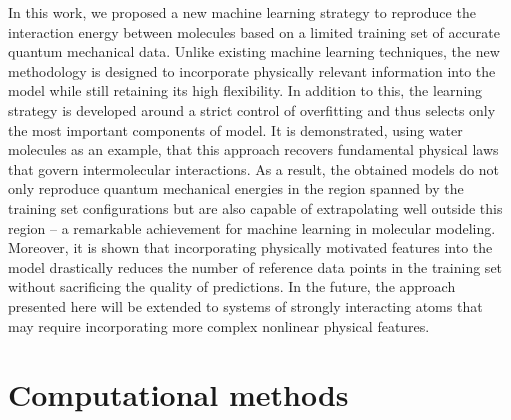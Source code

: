\documentclass[aps,prl,reprint,amsmath,amssymb,nature]{revtex4-1}
\begin{document}
In this work, we proposed a new machine learning strategy to reproduce the interaction energy between molecules based on a limited training set of accurate quantum mechanical data. Unlike existing machine learning techniques, the new methodology is designed to incorporate physically relevant information into the model while still retaining its high flexibility. In addition to this, the learning strategy is developed around a strict control of overfitting and thus selects only the most important components of model. 
It is demonstrated, using water molecules as an example, that this approach recovers fundamental physical laws that govern intermolecular interactions. As a result, the obtained models do not only reproduce quantum mechanical energies in the region spanned by the training set configurations but are also capable of extrapolating well outside this region -- a remarkable achievement for machine learning in molecular modeling. Moreover, it is shown that incorporating physically motivated features into the model drastically reduces the number of reference data points in the training set without sacrificing the quality of predictions. 
In the future, the approach presented here will be extended to systems of strongly interacting atoms 
that may require incorporating more complex nonlinear physical features. 


\section{Computational methods}
\end{document}
